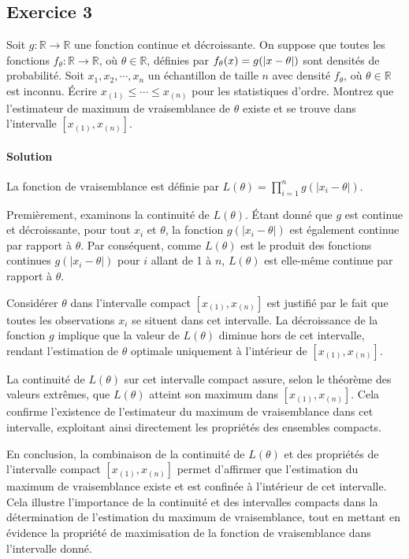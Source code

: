 \documentclass[../main.tex]{subfiles}
\begin{document}
\begin{CJK*}{UTF8}{gbsn}

\section*{Exercice 3}

Soit $g : \mathbb{R} \to \mathbb{R}$ une fonction continue et décroissante. 
On suppose que toutes les fonctions $f_{\theta} : \mathbb{R} \to \mathbb{R}$, 
où $\theta \in \mathbb{R}$, définies par $f_{\theta}(x) = g(\abs{x - \theta})$
sont densités de probabilité.
Soit $x_1, x_2, \cdots, x_n$ un échantillon de taille $n$ avec densité
$f_{\theta}$, où $\theta \in \mathbb{R}$ est inconnu.
Écrire $x_{(1)} \leqslant \cdots \leqslant x_{(n)}$ pour les statistiques d'ordre.
Montrez que l'estimateur de maximum de vraisemblance de $\theta$ existe et se trouve 
dans l'intervalle $[x_{(1)}, x_{(n)}]$.

\paragraph{Solution}
La fonction de vraisemblance est définie par
$L(\theta) = \prod_{i=1}^{n} g(|x_i - \theta|)$.

Premièrement, examinons la continuité de $L(\theta)$. Étant donné que $g$ est continue et décroissante,
pour tout $x_i$ et $\theta$, la fonction $g(|x_i - \theta|)$ est également continue par rapport à $\theta$.
Par conséquent, comme $L(\theta)$ est le produit des fonctions continues $g(|x_i - \theta|)$ pour $i$
allant de 1 à $n$, $L(\theta)$ est elle-même continue par rapport à $\theta$.

Considérer $\theta$ dans l'intervalle compact $[x_{(1)}, x_{(n)}]$ est justifié par le fait 
que toutes les observations $x_i$ se situent dans cet intervalle. La décroissance de la 
fonction $g$ implique que la valeur de $L(\theta)$ diminue hors de cet intervalle, 
rendant l'estimation de $\theta$ optimale uniquement à l'intérieur de $[x_{(1)}, x_{(n)}]$.

La continuité de $L(\theta)$ sur cet intervalle compact assure, selon le théorème des 
valeurs extrêmes, que $L(\theta)$ atteint son maximum dans $[x_{(1)}, x_{(n)}]$. 
Cela confirme l'existence de l'estimateur du maximum de vraisemblance dans cet intervalle,
exploitant ainsi directement les propriétés des ensembles compacts.

En conclusion, la combinaison de la continuité de $L(\theta)$ et des propriétés de l'intervalle compact
$[x_{(1)}, x_{(n)}]$ permet d'affirmer que l'estimation du maximum de vraisemblance existe et est
confinée à l'intérieur de cet intervalle. Cela illustre l'importance de la continuité et des intervalles
compacts dans la détermination de l'estimation du maximum de vraisemblance, tout en mettant en évidence
la propriété de maximisation de la fonction de vraisemblance dans l'intervalle donné.

\end{CJK*}
\end{document}
